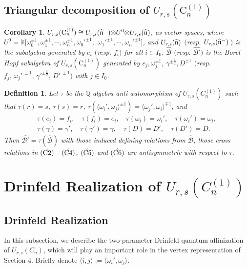 \documentclass{amsproc}
\newtheorem{defi}[theo]{Definition}
\newtheorem{coro}[theo]{Corollary}
\theoremstyle{remark}
\numberwithin{equation}{section}
\begin{document}
\subsection{Triangular decomposition of $
U_{r,s}(\mathrm{C}_n^{(1)})$}
\begin{coro}
$U_{r,s}(\mathrm{C}_n^{(1)})\cong U_{r,s}(\widehat{\frak n}^-){\otimes}
U^0{\otimes} U_{r,s}(\widehat{\frak n})$, as vector spaces,
where $U^0=\mathbb
K[{\omega}_0^{\pm1},{\omega}_1^{\pm1},\cdots,{\omega}_n^{\pm1},{{\omega}_0'}^{\pm1},$
${{\omega}_1'}^{\pm1},\cdots,{{\omega}_n'}^{\pm1}]$, and $U_{r,s}(\widehat{\frak n})$ $($resp.
$U_{r,s}(\widehat{\frak n}^-)$\,$)$ is the subalgebra generated
by $e_i$ $($resp. $f_i$$)$ for all $i\in I_0$.
$\hat{\mathcal B}$ $($resp. $\hat{\mathcal B'}$$)$ is the Borel Hopf
subalgebra of $U_{r, s}(\mathrm{C}_n^{(1)})$ generated by $e_j,
\omega_j^{ \pm1}$, $\gamma^{\pm\frac{1}2}, D^{\pm1}$ $($resp. $f_j,\,
\omega_j'^{\, \pm1}, \, \gamma'^{\pm\frac{1}2},\, D'^{\,\pm1})$ with
$j\in I_0$.
\end{coro}
\begin{defi}
Let $\tau$ be the $\mathbb{Q}$-algebra anti-automorphism of
$U_{r,s}(C_n^{(1)})$ such that $\tau(r)=s$, $\tau(s)=r$, $\tau({\langle}
{\omega}_i',{\omega}_j{\rangle}^{\pm1})={\langle} {\omega}_j',{\omega}_i{\rangle}^{\mp1}$, and
\begin{gather*}
\tau(e_i)=f_i, \quad \tau(f_i)=e_i, \quad \tau({\omega}_i)={\omega}_i',\quad
\tau({\omega}_i')={\omega}_i,\\
\tau(\gamma)=\gamma',\quad
\tau(\gamma')=\gamma,\quad\tau(D)=D',\quad \tau(D')=D.
\end{gather*}
Then ${\widehat{\mathcal B'}}=\tau({\widehat{\mathcal B}})$ with
those induced defining relations from ${\widehat{\mathcal B}}$,
those cross relations in $(\hat{\rm C2})$---$(\hat{\rm C4})$,
$(\hat{\rm C5})$ and $(\hat{\rm C6})$ are antisymmetric with respect
to $\tau$.
\end{defi}

\section{Drinfeld Realization of  $U_{r,s}(C_n^{(1)})$}
\subsection{Drinfeld Realization} In this subsection, we
describe the two-parameter Drinfeld quantum affinization of
$U_{r,s}(C_n)$, which will play an important role in the vertex
representation of Section 4. Briefly denote ${\langle} i,
j{\rangle}:={\langle}\omega_i', \omega_j{\rangle}$.
\end{document}
